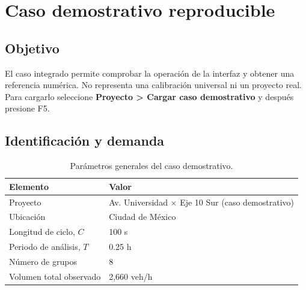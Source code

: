 \documentclass[11pt,letterpaper,oneside,openany]{report}
\begin{document}
\chapter{Caso demostrativo reproducible}

\section{Objetivo}

El caso integrado permite comprobar la operación de la interfaz y obtener una
referencia numérica. No representa una calibración universal ni un proyecto real.
Para cargarlo seleccione \textbf{Proyecto > Cargar caso demostrativo} y después
presione F5.

\section{Identificación y demanda}

\begin{table}[H]
\centering
\caption{Parámetros generales del caso demostrativo.}
\label{tab:demo-general}
\begin{tabularx}{\textwidth}{@{}L{4.4cm}Y@{}}
\toprule
{}
\textbf{Elemento} & \textbf{Valor} \\
\midrule
Proyecto & Av. Universidad $\times$ Eje 10 Sur (caso demostrativo) \\
Ubicación & Ciudad de México \\
Longitud de ciclo, $C$ & 100 s \\
Periodo de análisis, $T$ & 0.25 h \\
Número de grupos & 8 \\
Volumen total observado & 2,660 veh/h \\
\bottomrule
\end{tabularx}
\end{table}
\end{document}

